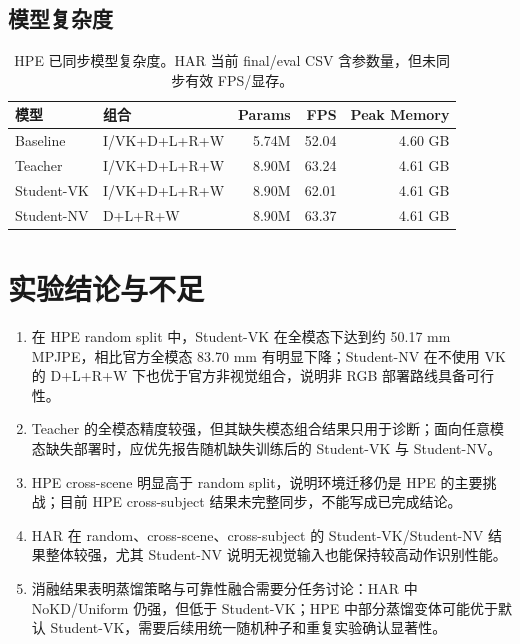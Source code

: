 \documentclass[UTF8,10pt]{ctexart}
\begin{document}
\subsection{模型复杂度}
\begin{table}[H]\centering\scriptsize
\caption{HPE 已同步模型复杂度。HAR 当前 final/eval CSV 含参数量，但未同步有效 FPS/显存。}
\begin{tabular}{llrrr}
\toprule
模型 & 组合 & Params & FPS & Peak Memory\\
\midrule
Baseline & I/VK+D+L+R+W & 5.74M & 52.04 & 4.60 GB\\
Teacher & I/VK+D+L+R+W & 8.90M & 63.24 & 4.61 GB\\
Student-VK & I/VK+D+L+R+W & 8.90M & 62.01 & 4.61 GB\\
Student-NV & D+L+R+W & 8.90M & 63.37 & 4.61 GB\\
\bottomrule
\end{tabular}
\end{table}

\section{实验结论与不足}
\begin{enumerate}
\item 在 HPE random split 中，Student-VK 在全模态下达到约 50.17 mm MPJPE，相比官方全模态 83.70 mm 有明显下降；Student-NV 在不使用 VK 的 D+L+R+W 下也优于官方非视觉组合，说明非 RGB 部署路线具备可行性。
\item Teacher 的全模态精度较强，但其缺失模态组合结果只用于诊断；面向任意模态缺失部署时，应优先报告随机缺失训练后的 Student-VK 与 Student-NV。
\item HPE cross-scene 明显高于 random split，说明环境迁移仍是 HPE 的主要挑战；目前 HPE cross-subject 结果未完整同步，不能写成已完成结论。
\item HAR 在 random、cross-scene、cross-subject 的 Student-VK/Student-NV 结果整体较强，尤其 Student-NV 说明无视觉输入也能保持较高动作识别性能。
\item 消融结果表明蒸馏策略与可靠性融合需要分任务讨论：HAR 中 NoKD/Uniform 仍强，但低于 Student-VK；HPE 中部分蒸馏变体可能优于默认 Student-VK，需要后续用统一随机种子和重复实验确认显著性。
\end{enumerate}

\appendix
\end{document}

